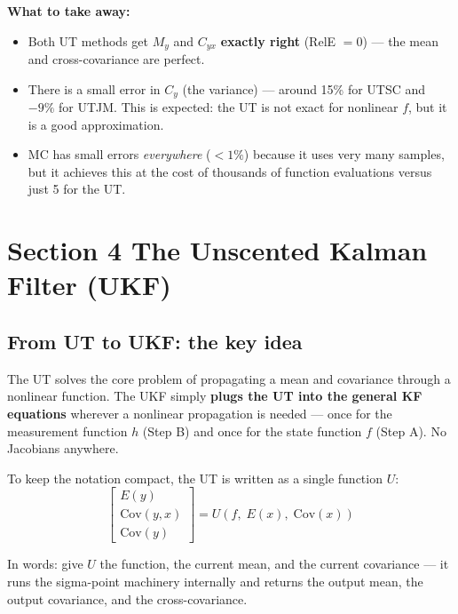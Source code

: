 \documentclass[12pt, a4paper]{article}
\begin{document}
\begin{notebox}
  \textbf{What to take away:}
  \begin{itemize}[leftmargin=1.4em, topsep=2pt]
    \item Both UT methods get $M_y$ and $C_{yx}$ \textbf{exactly right}
          (RelE $= 0$) --- the mean and cross-covariance are perfect.
    \item There is a small error in $C_y$ (the variance) --- around
          15\% for UTSC and $-9\%$ for UTJM.
          This is expected: the UT is not exact for nonlinear $f$,
          but it is a good approximation.
    \item MC has small errors \emph{everywhere} ($< 1\%$) because it
          uses very many samples, but it achieves this at the cost of
          thousands of function evaluations versus just 5 for the UT.
  \end{itemize}
\end{notebox}

\section*{Section 4 \quad The Unscented Kalman Filter (UKF)}

\subsection*{From UT to UKF: the key idea}

The UT solves the core problem of propagating a mean and covariance
through a nonlinear function.
The UKF simply \textbf{plugs the UT into the general KF equations}
wherever a nonlinear propagation is needed --- once for the
measurement function $h$ (Step B) and once for the state function $f$
(Step A).
No Jacobians anywhere.

To keep the notation compact, the UT is written as a single function
$U$:
\[
  \begin{bmatrix} E(y) \\ \mathrm{Cov}(y,x) \\ \mathrm{Cov}(y) \end{bmatrix}
  = U\!\left(f,\; E(x),\; \mathrm{Cov}(x)\right)
\]

In words: give $U$ the function, the current mean, and the current
covariance --- it runs the sigma-point machinery internally and
returns the output mean, the output covariance, and the
cross-covariance.
\end{document}
